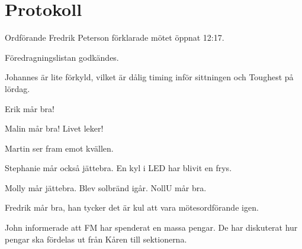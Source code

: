\documentclass[10pt]{article}
\def\mo{Fredrik Peterson}
\begin{document}
\section*{Protokoll}
\begin{paragrafer}
Ordförande {\mo} förklarade mötet öppnat 12:17.

\valavmo

\valavms

\tosg

\ingaadj


\valavj

Föredragningslistan godkändes.

\ingaprot

\begin{fyllnadsval} %
\end{fyllnadsval}

\begin{paragrafer}
Johannes är lite förkyld, vilket är dålig timing inför sittningen och Toughest på lördag.

Erik mår bra!

Malin mår bra! Livet leker!

Martin ser fram emot kvällen.

Stephanie mår också jättebra. En kyl i LED har blivit en frys.

Molly mår jättebra. Blev solbränd igår. NollU mår bra.

Fredrik mår bra, han tycker det är kul att vara mötesordförande igen.

John informerade att FM har spenderat en massa pengar. De har diskuterat hur pengar ska fördelas ut från Kåren till sektionerna.


\end{paragrafer}
\end{paragrafer}
\end{document}
